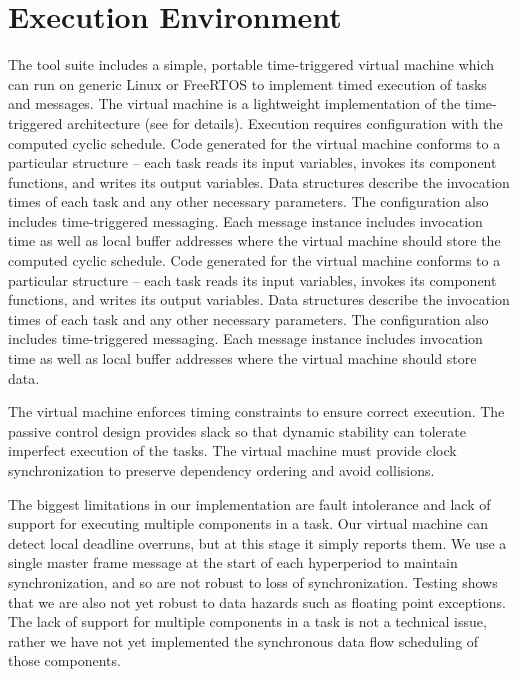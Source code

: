 \section{Execution Environment}

The tool suite includes a simple, portable time-triggered virtual machine\cite{timed:frodo} 
which can run on generic Linux or FreeRTOS to implement timed execution of tasks and messages.  
The virtual machine is a lightweight implementation of the time-triggered 
architecture\cite{timed:tta} (see \cite{timed:frodo} for details).  Execution requires 
configuration with the computed cyclic schedule.  Code generated for the virtual machine 
conforms to a particular structure -- each task reads its input variables, invokes its 
component functions, and writes its output variables.  Data structures describe the invocation 
times of each task and any other necessary parameters.  The configuration also includes 
time-triggered messaging.  Each message instance includes invocation time as well as local buffer 
addresses where the virtual machine should store the computed cyclic schedule.  Code generated for 
the virtual machine conforms to a particular structure -- each task reads its input variables, 
invokes its component functions, and writes its output variables.  Data structures describe the 
invocation times of each task and any other necessary parameters.  The configuration also includes 
time-triggered messaging.  Each message instance includes invocation time as well as local buffer 
addresses where the virtual machine should store data.

The virtual machine enforces timing constraints to ensure correct execution. The passive 
control design provides slack so that dynamic stability can tolerate imperfect execution 
of the tasks.  The virtual machine must provide clock synchronization to preserve dependency 
ordering and avoid collisions.

The biggest limitations in our implementation are fault intolerance and lack of support 
for executing multiple components in a task. Our virtual machine can detect local deadline 
overruns, but at this stage it simply reports them.  We use a single master frame message 
at the start of each hyperperiod to maintain synchronization, and so are not robust to 
loss of synchronization.  Testing shows that we are also not yet robust to data hazards 
such as floating point exceptions.  The lack of support for multiple components in a task 
is not a technical issue, rather we have not yet implemented the synchronous data flow 
scheduling of those components.
